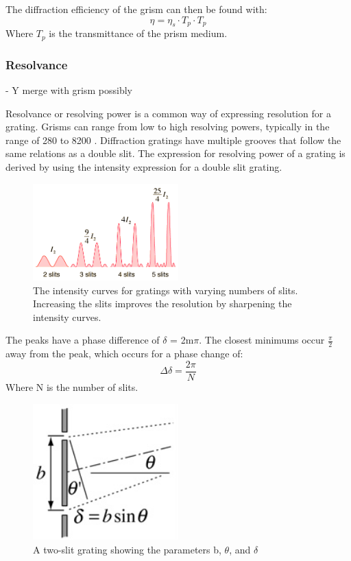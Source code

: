 The diffraction efficiency of the grism can then be found with: 
\begin{equation}
    \eta = \eta_s \cdot T_p \cdot T_p
\end{equation}
Where $T_p$ is the transmittance of the prism medium. 



\subsubsection{Resolvance} - Y merge with grism possibly 

Resolvance or resolving power is a common way of expressing resolution for a grating. Grisms can range from low to high resolving powers, typically in the range of 280 to 8200 \cite{Ebizuka2011-pr}. Diffraction gratings have multiple grooves that follow the same relations as a double slit. The expression for resolving power of a grating is derived by using the intensity expression for a double slit grating. 

\begin{figure}[H]
\centering
\includegraphics[width=0.5\textwidth]{figures/grating_intensity_curves.png}
\caption{The intensity curves for gratings with varying numbers of slits. Increasing the slits improves the resolution by sharpening the intensity curves.}
\label{fig:grating-intensity}
\end{figure}

The peaks have a phase difference of $\delta$ = 2m$\pi$. The closest minimums occur $\frac{\pi}{2}$ away from the peak, which occurs for a phase change of: 
\begin{equation}
\Delta \delta = \frac{2\pi}{N}
\end{equation}
Where N is the number of slits.

\begin{figure}[H]
\centering
\includegraphics[width=0.5\textwidth]{figures/grating-set-up.png}
\caption{A two-slit grating showing the parameters b, $\theta$, and $\delta$}
\label{fig:grating-set-up}
\end{figure}

